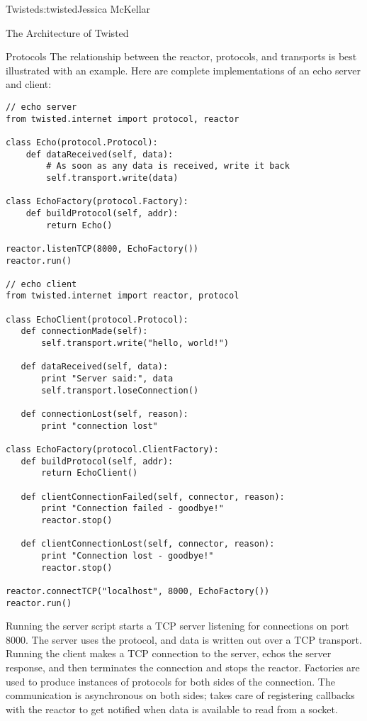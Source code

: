 \begin{aosachapter}{Twisted}{s:twisted}{Jessica McKellar}
\begin{aosasect1}{The Architecture of Twisted}
\begin{aosasect2}{Protocols}
The relationship between the reactor, protocols, and transports is best
illustrated with an example. Here are complete implementations of an echo
server and client:

\begin{verbatim}
// echo server
from twisted.internet import protocol, reactor

class Echo(protocol.Protocol):
    def dataReceived(self, data):
        # As soon as any data is received, write it back
        self.transport.write(data)

class EchoFactory(protocol.Factory):
    def buildProtocol(self, addr):
        return Echo()

reactor.listenTCP(8000, EchoFactory())
reactor.run()

// echo client
from twisted.internet import reactor, protocol

class EchoClient(protocol.Protocol):
   def connectionMade(self):
       self.transport.write("hello, world!")

   def dataReceived(self, data):
       print "Server said:", data
       self.transport.loseConnection()

   def connectionLost(self, reason):
       print "connection lost"

class EchoFactory(protocol.ClientFactory):
   def buildProtocol(self, addr):
       return EchoClient()

   def clientConnectionFailed(self, connector, reason):
       print "Connection failed - goodbye!"
       reactor.stop()

   def clientConnectionLost(self, connector, reason):
       print "Connection lost - goodbye!"
       reactor.stop()

reactor.connectTCP("localhost", 8000, EchoFactory())
reactor.run()
\end{verbatim}

Running the server script starts a TCP server listening for connections on
port 8000. The server uses the  protocol, and data is written
out over a TCP transport. Running the client makes a TCP connection to the
server, echos the server response, and then terminates the connection and stops
the reactor. Factories are used to produce instances of protocols for both sides
of the connection. The communication is asynchronous on both sides;
 takes care of registering callbacks with the reactor to
get notified when data is available to read from a socket.

\end{aosasect2}


\end{aosasect1}
\end{aosachapter}
